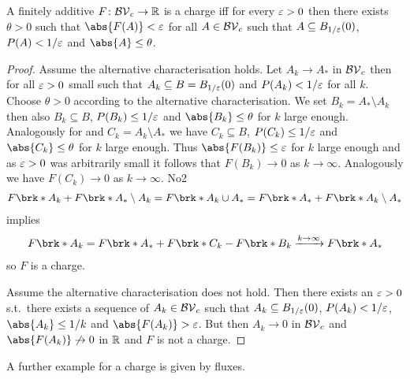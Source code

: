 \begin{lemma}
A finitely additive $F\colon \mathcal{BV}_c\to\mathbb{R}$ is a charge iff
for every $\varepsilon>0$ then there exists $\theta>0$ such that $\abs{F(A)}<\e$ for all $A\in\mathcal{BV}_c$ such that $A\subseteq B_{1/\varepsilon}(0)$, $P(A)<1/\varepsilon$ and $\abs{A}\leq\theta$.
\end{lemma}
\begin{proof}
Assume the alternative characterisation holds. Let $A_k\to A_*$ in $\mathcal{BV}_c$ then for all $\varepsilon>0$ small such that $A_k\subseteq B=B_{1/\varepsilon}(0)$ and $P(A_k)<1/\varepsilon$ for all $k$. Choose $\theta>0$ according to the alternative characterisation. We set $B_k=A_*\setminus A_k$ then also $B_k\subseteq B$, $P(B_k)\leq 1/\varepsilon$ and $\abs{B_k}\leq\theta$ for $k$ large enough. Analogously for and $C_k=A_k\setminus A_*$ we have 
$C_k\subseteq B$, $P(C_k)\leq 1/\varepsilon$ and $\abs{C_k}\leq\theta$ for $k$ large enough.
Thus $\abs{F(B_k)}\leq\e$ for $k$ large enough and as $\varepsilon>0$ was arbitrarily small it follows that $F(B_k)\to0$ as $k\to\infty$. Analogously we have $F(C_k)\to0$ as $k\to\infty$. 
No2 
\begin{align*}
	F\brk*{A_k}+F\brk*{A_*\setminus A_k} = F\brk*{A_k\cup A_*} = F\brk*{A_*}+F\brk*{A_k\setminus A_*}
\end{align*}
implies
\begin{align*}
	F\brk*{A_k} = F\brk*{A_*}+F\brk*{C_k}-F\brk*{B_k}\xrightarrow{k\to\infty}F\brk*{A_*}
\end{align*}
so $F$ is a charge.

Assume the alternative characterisation does not hold. Then there exists an $\varepsilon>0$ s.t.\ there exists a sequence of $A_k\in\mathcal{BV}_c$ such that $A_k\subseteq B_{1/\varepsilon}(0)$, $P(A_k)<1/\varepsilon$, $\abs{A_k}\leq 1/k$ and $\abs{F(A_k)}>\e$. But then $A_k\to0$ in $\mathcal{BV}_c$ and $\abs{F(A_k)}\not\to0$ in $\mathbb{R}$ and $F$ is not a charge.
\end{proof}

A further example for a charge is given by fluxes.

